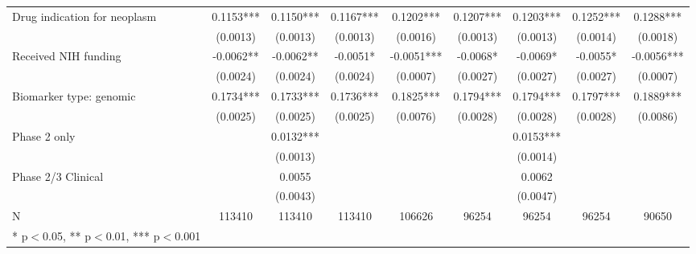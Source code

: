 \begin{table}[htb]
\begin{tabular}{l*{8}c}
Drug indication for neoplasm&      0.1153***&      0.1150*** &      0.1167***&      0.1202***&      0.1207***&      0.1203***&      0.1252***&      0.1288*** \\
                    &    (0.0013)   &    (0.0013)   &    (0.0013)   &    (0.0016)   &                  (0.0013)   &    (0.0013)   &    (0.0014)   &    (0.0018)  \\
Received NIH funding&     -0.0062** &     -0.0062** &     -0.0051*  &     -0.0051***&     -0.0068*  &     -0.0069*  &     -0.0055*  &     -0.0056***\\
                    &    (0.0024)   &    (0.0024)   &    (0.0024)   &    (0.0007)   &    (0.0027)   &    (0.0027)   &    (0.0027)   &    (0.0007)   \\
Biomarker type: genomic&      0.1734***&      0.1733***&      0.1736***&      0.1825***&      0.1794***&      0.1794***&      0.1797***&      0.1889***\\
                    &    (0.0025)   &    (0.0025)   &    (0.0025)   &    (0.0076)   &    (0.0028)   &    (0.0028)   &    (0.0028)   &    (0.0086)   \\
Phase 2 only        &               &      0.0132***&               &               &               &      0.0153***&               &               \\
                    &               &    (0.0013)   &               &               &               &    (0.0014)   &               &               \\
Phase 2/3 Clinical  &               &      0.0055   &               &               &               &      0.0062   &               &               \\
                    &               &    (0.0043)   &               &               &               &    (0.0047)   &               &               \\
N                   &      113410   &      113410   &      113410   &      106626   &       96254   &       96254   &       96254   &       90650   \\
* p$<$0.05, ** p$<$0.01, *** p$<$0.001 \\

\end{tabular}
\end{table}


